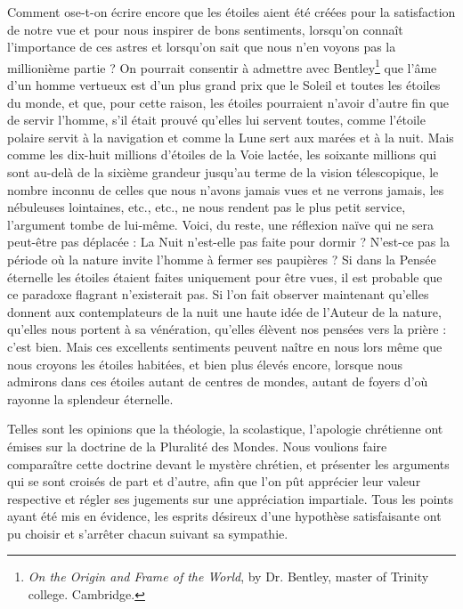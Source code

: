 \documentclass[a4paper, 11pt, oneside, landscape]{article}
\begin{document}
Comment ose-t-on écrire encore que les étoiles aient été créées pour la satisfaction de notre vue et pour nous inspirer de bons sentiments, lorsqu'on connaît l'importance de ces astres et lorsqu'on sait que nous n'en voyons pas la millionième partie ? On pourrait consentir à admettre avec Bentley\footnote{\emph{On the Origin and Frame of the World}, by Dr. Bentley, master of Trinity college. Cambridge.} que l'âme d'un homme vertueux est d'un plus grand prix que le Soleil et toutes les étoiles du monde, et que, pour cette raison, les étoiles pourraient n'avoir d'autre fin que de servir l'homme, s'il était prouvé qu'elles lui servent toutes, comme l'étoile polaire servit à la navigation et comme la Lune sert aux marées et à la nuit. Mais comme les dix-huit millions d'étoiles de la Voie lactée, les soixante millions qui sont au-delà de la sixième grandeur jusqu'au terme de la vision télescopique, le nombre inconnu de celles que nous n'avons jamais vues et ne verrons jamais, les nébuleuses lointaines, etc., etc., ne nous rendent pas le plus petit service, l'argument tombe de lui-même. Voici, du reste, une réflexion naïve qui ne sera peut-être pas déplacée : La Nuit n'est-elle pas faite pour dormir ? N'est-ce pas la période où la nature invite l'homme à fermer ses paupières ? Si dans la Pensée éternelle les étoiles étaient faites uniquement pour être vues, il est probable que ce paradoxe flagrant n'existerait pas. Si l'on fait observer maintenant qu'elles donnent aux contemplateurs de la nuit une haute idée de l'Auteur de la nature, qu'elles nous portent à sa vénération, qu'elles élèvent nos pensées vers la prière : c'est bien. Mais ces excellents sentiments peuvent naître en nous lors même que nous croyons les étoiles habitées, et bien plus élevés encore, lorsque nous admirons dans ces étoiles autant de centres de mondes, autant de foyers d'où rayonne la splendeur éternelle.

Telles sont les opinions que la théologie, la scolastique, l'apologie chrétienne ont émises sur la doctrine de la Pluralité des Mondes. Nous voulions faire comparaître cette doctrine devant le mystère chrétien, et présenter les arguments qui se sont croisés de part et d'autre, afin que l'on pût apprécier leur valeur respective et régler ses jugements sur une appréciation impartiale. Tous les points ayant été mis en évidence, les esprits désireux d'une hypothèse satisfaisante ont pu choisir et s'arrêter chacun suivant sa sympathie.
\end{document}
